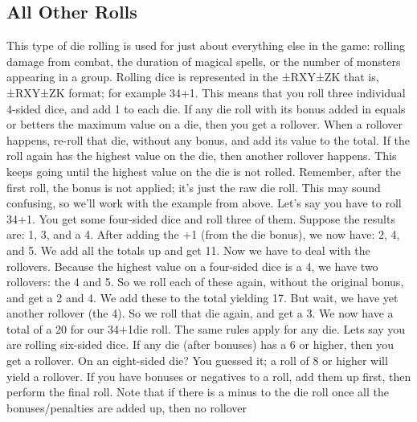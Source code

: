 \documentclass[twoside]{book}
\begin{document}
\subsection{All Other Rolls}
     This type of die rolling is used for just about
               everything else in the game: rolling damage from combat,
               the duration of magical spells, or the number of monsters
               appearing in a group.  Rolling dice is represented in the
                ±RXY±ZK that is,
                ±RXY±ZK format; for
               example 34+1. This means that you roll three individual
               4-sided dice, and add 1 to each die.  If any die roll with its bonus added in equals or
               betters the maximum value on a die, then you get a
               rollover. When a rollover happens, re-roll that die,
               without any bonus, and add its value to the total. If the
               roll again has the highest value on the die, then another
               rollover happens. This keeps going until the highest value
               on the die is not rolled. Remember, after the first roll,
               the bonus is not applied; it’s just the raw die
               roll.  This may sound confusing, so we’ll work with
               the example from above. Let’s say you have to roll
               34+1. You get some four-sided dice and roll three of
               them. Suppose the results are: 1, 3, and a 4. After adding
               the +1 (from the die bonus), we now have: 2, 4, and 5. We
               add all the totals up and get 11. Now we have to deal with
               the rollovers. Because the highest value on a four-sided
               dice is a 4, we have two rollovers: the 4 and 5. So we
               roll each of these again, without the original bonus, and
               get a 2 and 4. We add these to the total yielding 17. But
               wait, we have yet another rollover (the 4). So we roll
               that die again, and get a 3. We now have a total of a 20
               for our 34+1die roll.  The same rules apply for any die. Lets say you are
               rolling six-sided dice. If any die (after bonuses) has a 6
               or higher, then you get a rollover. On an eight-sided die?
               You guessed it; a roll of 8 or higher will yield a
               rollover.  If you have bonuses or negatives to a roll, add them
               up first, then perform the final roll.  Note that if there is a minus to the die roll once
               all the bonuses/penalties are added up, then no rollover
\end{document}
